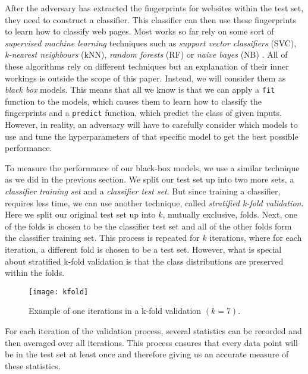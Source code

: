 After the adversary has extracted the fingerprints for websites within the test set, they need to construct a classifier.
This classifier can then use these fingerprints to learn how to classify web pages.
Most works so far rely on some sort of \textit{supervised machine learning} techniques such as \textit{support vector classifiers} (SVC), \textit{k-nearest neighbours} (kNN), \textit{random forests} (RF) or \textit{naive bayes} (NB) \cite{panchenko1,panchenko2,wang_cai_johnson_nithyanand_goldberg_2014,kfingerprinting,naivebayes}.
All of these algorithms rely on different techniques but an explanation of their inner workings is outside the scope of this paper.
Instead, we will consider them as \textit{black box} models.
This means that all we know is that we can apply a \texttt{fit} function to the models, which causes them to learn how to classify the fingerprints and a \texttt{predict} function, which predict the class of given inputs.
However, in reality, an adversary will have to carefully consider which models to use and tune the hyperparameters of that specific model to get the best possible performance.

To measure the performance of our black-box models, we use a similar technique as we did in the previous section.
We split our test set up into two more sets, a \textit{classifier training set} and a \textit{classifier test set}.
But since training a classifier, requires less time, we can use another technique, called \textit{stratified k-fold validation}.
Here we split our original test set up into $k$, mutually exclusive, folds.
Next, one of the folds is chosen to be the classifier test set and all of the other folds form the classifier training set.
This process is repeated for $k$ iterations, where for each iteration, a different fold is chosen to be a test set.
However, what is special about stratified k-fold validation is that the class distributions are preserved within the folds.

\begin{figure}[ht]
  \centering
  \texttt{[image: kfold]}
  \caption{Example of one iterations in a k-fold validation $(k = 7)$.}
  \label{fig:kfold}
\end{figure}

For each iteration of the validation process, several statistics can be recorded and then averaged over all iterations.
This process ensures that every data point will be in the test set at least once and therefore giving us an accurate measure of these statistics.

